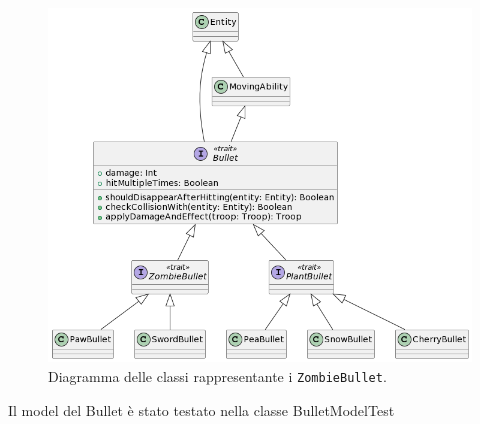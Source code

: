 \begin{figure}[H]
    \centering
    \includegraphics[width=1\linewidth]{images/model-bullet}
    \caption{Diagramma delle classi rappresentante i \texttt{ZombieBullet}.}
    \label{fig:class-bullet}
\end{figure}

Il model del Bullet è stato testato nella classe BulletModelTest

